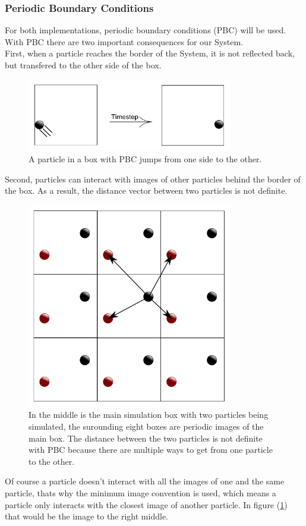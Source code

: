 \subsubsection*{Periodic Boundary Conditions}
For both implementations, periodic boundary conditions (PBC) will be used.
With PBC there are two important consequences for our System. \\
First, when a particle reaches the border of the System, it is not reflected back, but transfered to the other side of the box.
\begin{figure}[h!]
\centering
\includegraphics[width=0.8\textwidth]{PBCjump.pdf}
\caption[PBC: Jump Case]{A particle in a box with PBC jumps from one side to the other.}
\end{figure}
Second, particles can interact with images of other particles behind the border of the box. As a result, the distance vector between two particles is not definite. 
\begin{figure}[h!]
\centering
\includegraphics[width=0.8\textwidth]{PBCinteraction.pdf}
\caption[PBC: Interaction Case]{In the middle is the main simulation box with two particles being simulated, the surounding eight boxes are periodic images of the main box. The distance between the two particles is not definite with PBC because there are multiple ways to get from one particle to the other.}
\label{PBCinteraction}
\end{figure}
Of course a particle doesn't interact with all the images of one and the same particle, thats why the minimum image convention is used, which means a particle only interacts with the closest image of another particle. In figure (\ref{PBCinteraction}) that would be the image to the right middle.





